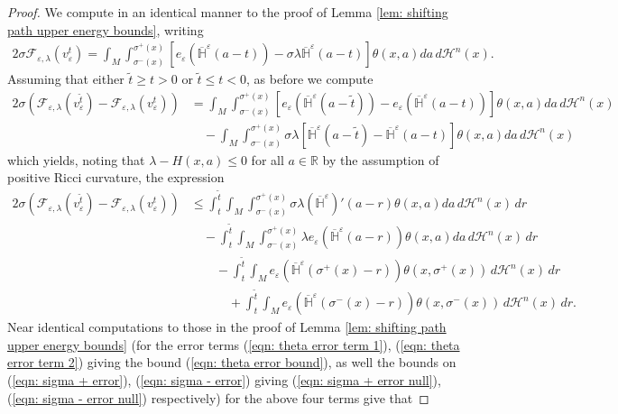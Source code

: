\documentclass[10pt,a4paper]{amsart}
\begin{document}
\begin{proof}
We compute in an identical manner to the proof of Lemma \ref{lem: shifting path upper energy bounds}, writing
\begin{align*}
    2\sigma \mathcal{F}_{\varepsilon,\lambda}(v^t_\varepsilon) = \int_M \int_{\sigma^-(x)}^{\sigma^+(x)} \left[e_\varepsilon\left(\overline{\mathbb{H}}^\varepsilon(a - t)\right) - \sigma\lambda\overline{\mathbb{H}}^\varepsilon(a - t) \right]\theta(x,a) da\, d\mathcal{H}^n(x).
\end{align*}
Assuming that either $\tilde{t} \geq t > 0$ or $\tilde{t} \leq t < 0$, as before we compute
\begin{align*}
    2\sigma(\mathcal{F}_{\varepsilon,\lambda}(v^{\tilde{t}}_\varepsilon) - \mathcal{F}_{\varepsilon,\lambda}(v^t_\varepsilon)) &= \int_M \int_{\sigma^-(x)}^{\sigma^+(x)} \left[e_\varepsilon\left(\overline{\mathbb{H}}^\varepsilon(a - \tilde{t})\right) - e_\varepsilon\left(\overline{\mathbb{H}}^\varepsilon(a - t)\right) \right]\theta(x,a) da\, d\mathcal{H}^n(x)\\
    \label{eqn: 1d term}
    &\quad -\int_M \int_{\sigma^-(x)}^{\sigma^+(x)} \sigma\lambda\left[\overline{\mathbb{H}}^\varepsilon(a - \tilde{t}) - \overline{\mathbb{H}}^\varepsilon(a - t) \right]\theta(x,a) da\, d\mathcal{H}^n(x)
\end{align*}
which yields, noting that $\lambda - H(x,a) \leq 0$ for all $a \in \mathbb{R}$ by the assumption of positive Ricci curvature, the expression
\begin{align*}
     2\sigma(\mathcal{F}_{\varepsilon,\lambda}(v^{\tilde{t}}_\varepsilon) - \mathcal{F}_{\varepsilon,\lambda}(v^t_\varepsilon)) &\leq  \int_t^{\tilde{t}} \int_M \int_{\sigma^-(x)}^{\sigma^+(x)} \sigma\lambda  (\overline{\mathbb{H}}^\varepsilon)'(a - r)\theta(x,a) da\,d\mathcal{H}^n(x)\,dr\\
     &\quad - \int_t^{\tilde{t}} \int_M \int_{\sigma^-(x)}^{\sigma^+(x)} \lambda e_\varepsilon(\overline{\mathbb{H}}^\varepsilon(a - r)) \theta(x,a) da \, d\mathcal{H}^n(x) \, dr\\
     &\quad\quad -\int_t^{\tilde{t}} \int_M e_\varepsilon\left(\overline{\mathbb{H}}^\varepsilon(\sigma^+(x) - r)\right)\theta(x,\sigma^+(x)) \, d\mathcal{H}^n(x)\,dr\\
     &\quad\quad\quad +\int_t^{\tilde{t}} \int_M e_\varepsilon\left(\overline{\mathbb{H}}^\varepsilon(\sigma^-(x) - r)\right)\theta(x,\sigma^-(x)) \, d\mathcal{H}^n(x)\,dr.
\end{align*}
Near identical computations to those in the proof of Lemma \ref{lem: shifting path upper energy bounds} (for the error terms (\ref{eqn: theta error term 1}), (\ref{eqn: theta error term 2}) giving the bound (\ref{eqn: theta error bound}), as well the bounds on (\ref{eqn: sigma + error}), (\ref{eqn: sigma - error}) giving (\ref{eqn: sigma + error null}), (\ref{eqn: sigma - error null}) respectively) for the above four terms give that 

\end{proof}
\end{document}

